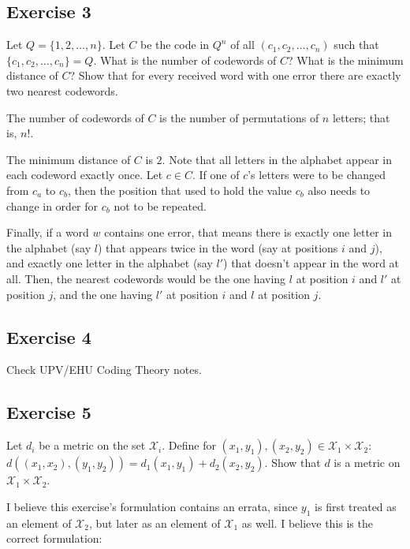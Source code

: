 \subsection{Exercise 3}

\begin{formulationBox}
	Let $Q = \{1,2,\hdots,n\}$. Let $C$ be the code in $Q^n$ of all $(c_1, c_2, \hdots, c_n)$ such that $\{c_1, c_2, \hdots, c_n\} = Q$. What is the number of codewords of $C$? What is the minimum distance of $C$? Show that for every received word with one error there are exactly two nearest codewords.
\end{formulationBox}

The number of codewords of $C$ is the number of permutations of $n$ letters; that is, $n!$.

The minimum distance of $C$ is $2$. Note that all letters in the alphabet appear in each codeword exactly once. Let $c \in C$. If one of $c$'s letters were to be changed from $c_a$ to $c_b$, then the position that used to hold the value $c_b$ also needs to change in order for $c_b$ not to be repeated.

Finally, if a word $w$ contains one error, that means there is exactly one letter in the alphabet (say $l$) that appears twice in the word (say at positions $i$ and $j$), and exactly one letter in the alphabet (say $l'$) that doesn't appear in the word at all. Then, the nearest codewords would be the one having $l$ at position $i$ and $l'$ at position $j$, and the one having $l'$ at position $i$ and $l$ at position $j$.

\subsection{Exercise 4}

Check UPV/EHU Coding Theory notes.

\subsection{Exercise 5}

\begin{formulationBox}
	Let $d_i$ be a metric on the set $\mathcal{X}_i$. Define for $(x_1, y_1), (x_2, y_2) \in \mathcal{X}_1\times\mathcal{X}_2$: $d((x_1, x_2), (y_1, y_2)) = d_1(x_1, y_1) + d_2(x_2, y_2)$. Show that $d$ is a metric on $\mathcal{X}_1\times\mathcal{X}_2$.
\end{formulationBox}

I believe this exercise's formulation contains an errata, since $y_1$ is first treated as an element of $\mathcal{X}_2$, but later as an element of $\mathcal{X}_1$ as well. I believe this is the correct formulation:


